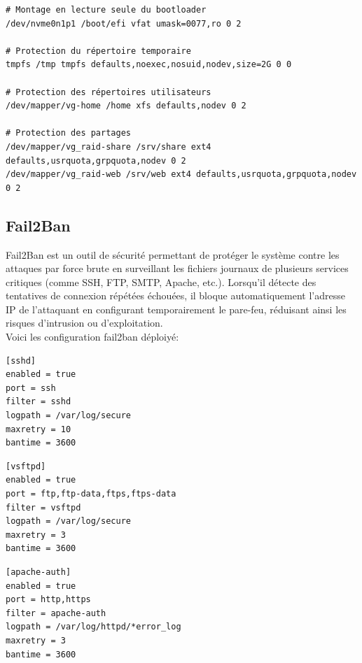 \documentclass[a4paper,12pt]{article}
\begin{document}
\begin{lstlisting}[caption={Configuration Système – /etc/fstab}]
# Montage en lecture seule du bootloader
/dev/nvme0n1p1 /boot/efi vfat umask=0077,ro 0 2

# Protection du répertoire temporaire
tmpfs /tmp tmpfs defaults,noexec,nosuid,nodev,size=2G 0 0

# Protection des répertoires utilisateurs
/dev/mapper/vg-home /home xfs defaults,nodev 0 2

# Protection des partages
/dev/mapper/vg_raid-share /srv/share ext4 defaults,usrquota,grpquota,nodev 0 2
/dev/mapper/vg_raid-web /srv/web ext4 defaults,usrquota,grpquota,nodev 0 2
\end{lstlisting}

\subsection{Fail2Ban}

Fail2Ban est un outil de sécurité permettant de protéger le système contre les attaques par force brute en surveillant les fichiers journaux de plusieurs services critiques (comme SSH, FTP, SMTP, Apache, etc.). Lorsqu'il détecte des tentatives de connexion répétées échouées, il bloque automatiquement l'adresse IP de l'attaquant en configurant temporairement le pare-feu, réduisant ainsi les risques d'intrusion ou d'exploitation.\\
Voici les configuration fail2ban déploiyé: 

\begin{lstlisting}[caption={Configuration Fail2Ban SSH – /etc/fail2ban/jail.d/sshd.local}]
[sshd]
enabled = true
port = ssh
filter = sshd
logpath = /var/log/secure
maxretry = 10
bantime = 3600
\end{lstlisting}

\begin{lstlisting}[caption={Configuration Fail2Ban FTP – /etc/fail2ban/jail.d/ftp.local}]
[vsftpd]
enabled = true
port = ftp,ftp-data,ftps,ftps-data
filter = vsftpd
logpath = /var/log/secure
maxretry = 3
bantime = 3600
\end{lstlisting}

\begin{lstlisting}[caption={Configuration Fail2Ban Apache – /etc/fail2ban/jail.d/apache.local}]
[apache-auth]
enabled = true
port = http,https
filter = apache-auth
logpath = /var/log/httpd/*error_log
maxretry = 3
bantime = 3600
\end{lstlisting}
\end{document}
